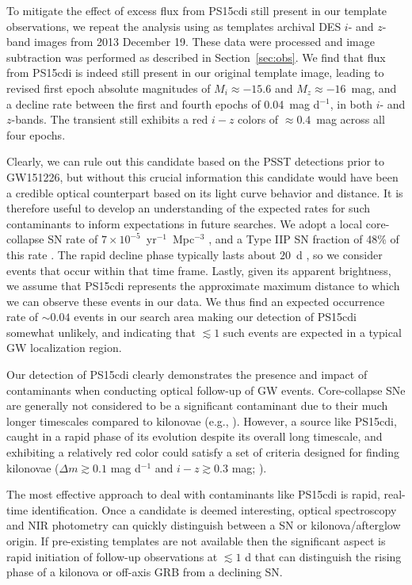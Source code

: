 To mitigate the effect of excess flux from PS15cdi still present in our template observations, we repeat the analysis 
using as templates archival DES $i$- and $z$-band images from 2013 December 19. These data were processed 
and image subtraction was performed as described in Section~\ref{sec:obs}. We find that flux from PS15cdi is indeed still present 
in our original template image, leading to revised first epoch absolute magnitudes of $M_i \approx -15.6$ and 
$M_z \approx -16$~mag, and a decline rate between the first and fourth epochs of 0.04~mag d$^{-1}$, in both 
$i$- and $z$-bands. The transient still exhibits a red $i-z$ colors of $\approx 0.4$~mag across all four epochs. 
 
Clearly, we can rule out this candidate based on the PSST detections prior to 
GW151226, but without this crucial information this candidate
would have been a credible optical counterpart based on its light curve behavior and distance. 
It is therefore useful to develop an understanding of the expected rates for such contaminants
to inform expectations in future searches. We adopt a local core-collapse SN rate of  
$7\times10^{-5}$~yr$^{-1}$~Mpc$^{-3}$ \citep{li+11,capp+15}, 
and a Type IIP SN fraction of 48\% of this rate \citep{smith+11}. The rapid
decline phase typically lasts about $20$~d \citep{kasen09,dhun+16,sanders+15}, 
so we consider events that occur within that time frame. Lastly, given its apparent brightness, 
we assume that PS15cdi represents the approximate maximum distance to which we can observe
these events in our data. We thus find an expected occurrence rate of $\sim 0.04$ events in our search area
making our detection of PS15cdi somewhat unlikely, and indicating that $\lesssim 1$ such 
events are expected in a typical GW localization region.

Our detection of PS15cdi clearly demonstrates the presence and impact
of contaminants when conducting optical follow-up of GW events.
Core-collapse SNe are generally not considered to be a
significant contaminant due to their much longer timescales compared
to kilonovae (e.g., \citealt{cowp15}). However, a
source like PS15cdi, caught in a rapid phase of its evolution 
despite its overall long timescale, and
exhibiting a relatively red color could
satisfy a set of criteria designed for finding kilonovae ($\Delta m\gtrsim
0.1$ mag d$^{-1}$ and $i-z\gtrsim 0.3$ mag; \citealt{cowp15}). 

The most effective approach to deal with contaminants like PS15cdi is rapid,
real-time identification. Once a candidate is deemed interesting, optical spectroscopy and 
NIR photometry can quickly distinguish between a SN or kilonova/afterglow
origin. If pre-existing templates are not available then the significant aspect is rapid initiation of
follow-up observations at $\lesssim 1$ d that can distinguish the rising phase of a kilonova or 
off-axis GRB from a declining SN.

